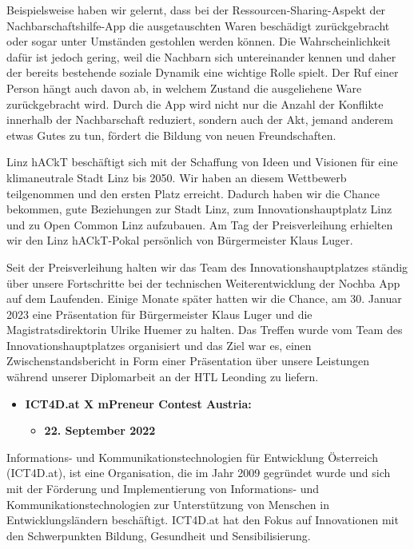 Beispielsweise haben wir gelernt, dass bei der Ressourcen-Sharing-Aspekt der Nachbarschaftshilfe-App die ausgetauschten Waren beschädigt zurückgebracht oder sogar unter Umständen gestohlen werden können. Die Wahrscheinlichkeit dafür ist jedoch gering, weil die Nachbarn sich untereinander kennen und daher der bereits bestehende soziale Dynamik eine wichtige Rolle spielt. Der Ruf einer Person hängt auch davon ab, in welchem Zustand die ausgeliehene Ware zurückgebracht wird. Durch die App wird nicht nur die Anzahl der Konflikte innerhalb der Nachbarschaft reduziert, sondern auch der Akt, jemand anderem etwas Gutes zu tun, fördert die Bildung von neuen Freundschaften.

Linz hACkT beschäftigt sich mit der Schaffung von Ideen und Visionen für eine klimaneutrale Stadt Linz bis 2050. Wir haben an diesem Wettbewerb teilgenommen und den ersten Platz erreicht. Dadurch haben wir die Chance bekommen, gute Beziehungen zur Stadt Linz, zum Innovationshauptplatz Linz und zu Open Common Linz aufzubauen. Am Tag der Preisverleihung erhielten wir den Linz hACkT-Pokal persönlich von Bürgermeister Klaus Luger.

Seit der Preisverleihung halten wir das Team des Innovationshauptplatzes ständig über unsere Fortschritte bei der technischen Weiterentwicklung der Nochba App auf dem Laufenden. Einige Monate später hatten wir die Chance, am 30. Januar 2023 eine Präsentation für Bürgermeister Klaus Luger und die Magistratsdirektorin Ulrike Huemer zu halten. Das Treffen wurde vom Team des Innovationshauptplatzes organisiert und das Ziel war es, einen Zwischenstandsbericht in Form einer Präsentation über unsere Leistungen während unserer Diplomarbeit an der HTL Leonding zu liefern.

\begin{itemize}
    \item \textbf{ICT4D.at X mPreneur Contest Austria:}
    \begin{itemize}
        \item \textbf{22. September 2022}
    \end{itemize}
\end{itemize}


Informations- und Kommunikationstechnologien für Entwicklung Österreich (ICT4D.at), ist eine Organisation, die im Jahr 2009 gegründet wurde und sich mit der Förderung und Implementierung von Informations- und Kommunikationstechnologien zur Unterstützung von Menschen in Entwicklungsländern beschäftigt. ICT4D.at hat den Fokus auf Innovationen mit den Schwerpunkten Bildung, Gesundheit und Sensibilisierung.

